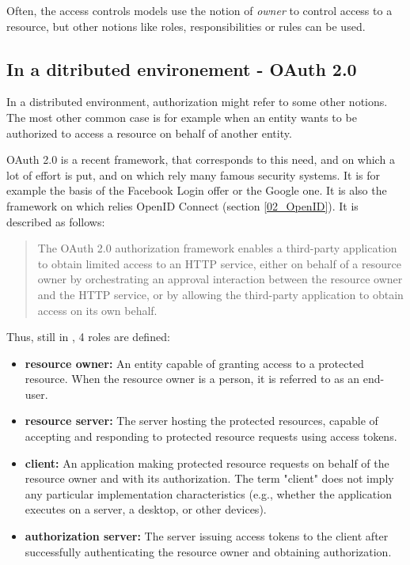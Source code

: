 Often, the access controls models use the notion of \textit{owner} to control access to a resource, but other notions like roles, responsibilities or rules can be used.
 

\subsection{In a ditributed environement - OAuth 2.0}
\label{02_OAuth}

In a distributed environment, authorization might refer to some other notions. The most other common case is for example when an entity wants to be authorized to access a resource on behalf of another entity.

OAuth 2.0 is a recent framework, that corresponds to this need, and on which a lot of effort is put, and on which rely many famous security systems. It is for example the basis of the Facebook Login offer or the Google one. It is also the framework on which relies OpenID Connect (section \ref{02_OpenID}). It  is described as follows\cite{hardt2012oauth}: 

\begin{quote}
	The OAuth 2.0 authorization framework enables a third-party
	application to obtain limited access to an HTTP service, either on
	behalf of a resource owner by orchestrating an approval interaction
	between the resource owner and the HTTP service, or by allowing the
	third-party application to obtain access on its own behalf.
\end{quote}
Thus, still in \cite{hardt2012oauth}, 4 roles are defined:
\begin{itemize}
	\item \textbf{resource owner:} An entity capable of granting access to a protected resource.
	When the resource owner is a person, it is referred to as an
	end-user.
	\item \textbf{resource server:} The server hosting the protected resources, capable of accepting
	and responding to protected resource requests using access tokens.
	\item \textbf{client:} An application making protected resource requests on behalf of the
	resource owner and with its authorization.  The term "client" does
	not imply any particular implementation characteristics (e.g.,
	whether the application executes on a server, a desktop, or other
	devices).
	\item \textbf{authorization server:} The server issuing access tokens to the client after successfully
	authenticating the resource owner and obtaining authorization.
\end{itemize}


